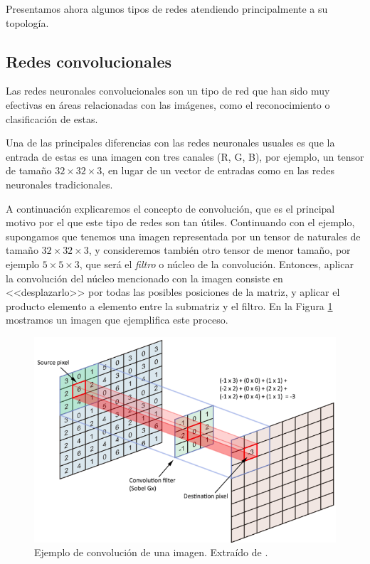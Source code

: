 \documentclass[
  a4paper,
  12pt,
  spanish,
]{scrartcl}
\theoremstyle{teorema-style}
\begin{document}
Presentamos ahora algunos tipos de redes atendiendo principalmente a su topología.

\subsection{Redes convolucionales}%
\label{sub:redes_convolucionales}

Las redes neuronales convolucionales son un tipo de red que han sido muy efectivas en áreas relacionadas con las imágenes, como el reconocimiento o clasificación de estas.

Una de las principales diferencias con las redes neuronales usuales es que la entrada de estas es una imagen con tres canales (R, G, B), por ejemplo, un tensor de tamaño $32\times 32 \times 3$, en lugar de un vector de entradas como en las redes neuronales tradicionales.

A continuación explicaremos el concepto de convolución, que es el principal motivo por el que este tipo de redes son tan útiles. Continuando con el ejemplo, supongamos que tenemos una imagen representada por un tensor de naturales de tamaño $32\times 32 \times 3$, y consideremos también otro tensor de menor tamaño, por ejemplo $5 \times 5 \times 3$, que será el \textit{filtro} o núcleo de la convolución. Entonces, aplicar la convolución del núcleo mencionado con la imagen consiste en <<desplazarlo>> por todas las posibles posiciones de la matriz, y aplicar el producto elemento a elemento entre la submatriz y el filtro. En la Figura \ref{fig:conv} mostramos un imagen que ejemplifica este proceso.

\begin{figure}[h]
    \centering
    \includegraphics[width=0.7\linewidth]{img/conv.png}
    \caption{Ejemplo de convolución de una imagen. Extraído de \parencite{arden_cnn_2017}.}%
    \label{fig:conv}
\end{figure}
\end{document}
